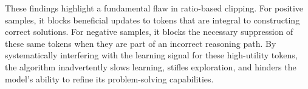 These findings highlight a fundamental flaw in ratio-based clipping. For positive samples, it blocks beneficial updates to tokens that are integral to constructing correct solutions. For negative samples, it blocks the necessary suppression of these same tokens when they are part of an incorrect reasoning path. By systematically interfering with the learning signal for these high-utility tokens, the algorithm inadvertently slows learning, stifles exploration, and hinders the model's ability to refine its problem-solving capabilities.






